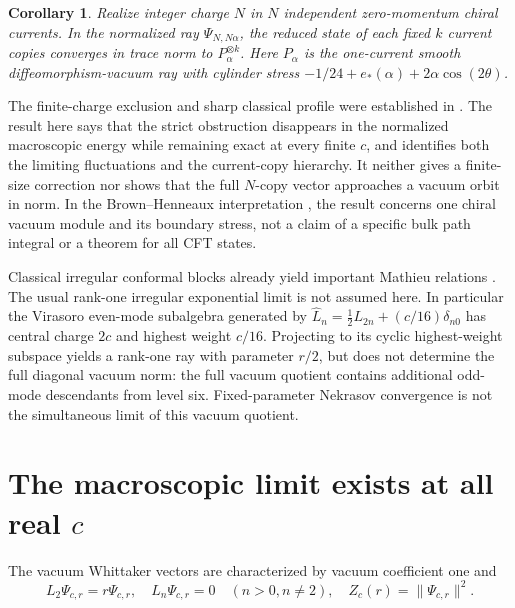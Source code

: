\documentclass[11pt]{article}
\newtheorem{corollary}[theorem]{Corollary}
\begin{document}
\begin{corollary}\label{cor:product}
Realize integer charge \(N\) in \(N\) independent zero-momentum chiral currents. In the normalized ray \(\Psi_{N,N\alpha}\), the reduced state of each fixed \(k\) current copies converges in trace norm to \(P_\alpha^{\otimes k}\). Here \(P_\alpha\) is the one-current smooth diffeomorphism-vacuum ray with cylinder stress \(-1/24+e_*(\alpha)+2\alpha\cos(2\theta)\).
\end{corollary}

The finite-charge exclusion and sharp classical profile were established in \cite{p34}. The result here says that the strict obstruction disappears in the normalized macroscopic energy while remaining exact at every finite \(c\), and identifies both the limiting fluctuations and the current-copy hierarchy. It neither gives a finite-size correction nor shows that the full \(N\)-copy vector approaches a vacuum orbit in norm. In the Brown--Henneaux interpretation \cite{bh,cotler}, the result concerns one chiral vacuum module and its boundary stress, not a claim of a specific bulk path integral or a theorem for all CFT states.

Classical irregular conformal blocks already yield important Mathieu relations \cite{piatek14,piatek15}. The usual rank-one irregular exponential limit is not assumed here. In particular the Virasoro even-mode subalgebra generated by \(\widehat L_n=\tfrac12 L_{2n}+(c/16)\delta_{n0}\) has central charge \(2c\) and highest weight \(c/16\). Projecting to its cyclic highest-weight subspace yields a rank-one ray with parameter \(r/2\), but does not determine the full diagonal vacuum norm: the full vacuum quotient contains additional odd-mode descendants from level six. Fixed-parameter Nekrasov convergence \cite{nekrasov} is not the simultaneous limit of this vacuum quotient.
\section{\texorpdfstring{The macroscopic limit exists at all real \(c\)}{The macroscopic limit exists at all real c}}\label{the-macroscopic-limit-exists-at-all-real-c}

The vacuum Whittaker vectors are characterized by vacuum coefficient one and \[
 L_2\Psi_{c,r}=r\Psi_{c,r},\quad L_n\Psi_{c,r}=0\quad (n>0,n\ne2),\quad
 Z_c(r)=\|\Psi_{c,r}\|^2.
\]
\end{document}
